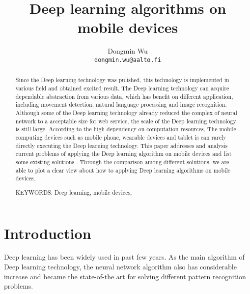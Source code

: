 \documentclass[article]{aaltoseries}
\begin{document}
 

\title{Deep learning algorithms on mobile devices}

\author{Dongmin Wu
\\\textnormal{\texttt{dongmin.wu@aalto.fi}}} %


\maketitle


\begin{abstract}

  Since the Deep learning technology was pulished, this technology is
  implemented in various field and obtained excited result. The Deep learning technology can acquire 
  dependable abstraction from various data, which has benefit on different application, 
  including movement detection, natural language processing and image recognition. 
  Although some of the Deep learning technology 
  already reduced the complex of neural network to a acceptable size for web service, the 
 scale of the Deep learning technology is still large. According to the high dependency on computation resources,
 The mobile computing
  devices such as mobile phone, wearable devices and tablet is can rarely directly executing the Deep learning technology. 
  This paper addresses and analysis current problems
   of applying the Deep learning algorithm on mobile devices and list some existing solutions
  . Through the comparison among different solutions, we are able to 
  plot a clear view about how to applying Deep learning algorithms on mobile devices.

\vspace{3mm}
\noindent KEYWORDS: Deep learning, mobile devices, 

\end{abstract}




\section{Introduction}


Deep learning has been widely used in past few years. As the main algorithm of Deep learning technology,
 the neural network algorithm 
also has considerable increase and became the state-of-the art for solving different pattern recognition
problems.
\end{document}
